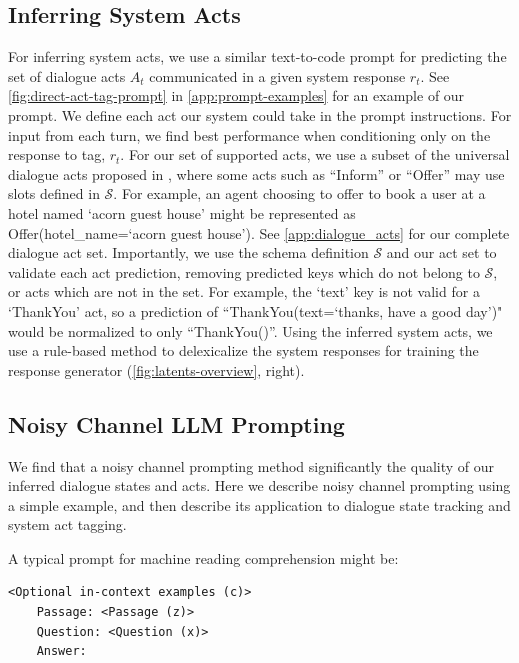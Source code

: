 \documentclass[11pt]{article}
\newcommand{\schema}[0]{\mathcal{S}}
\newcommand{\bdk}[1]{}
\newcommand{\jmf}[1]{}
\begin{document}
\subsection{Inferring System Acts} 
\label{sec:methods-tagging}
For inferring system acts, we use a similar text-to-code prompt for predicting the set of dialogue acts $A_t$ communicated in a given system response $r_t$.
See \autoref{fig:direct-act-tag-prompt} in \autoref{app:prompt-examples} for an example of our prompt.
We define each act our system could take in the prompt instructions.
For input from each turn, we find best performance when conditioning only on the response to tag, $r_t$.
For our set of supported acts, we use a subset of the universal dialogue acts proposed in \citet{paul19b_interspeech}, where some acts such as ``Inform'' or ``Offer'' may use slots defined in $\schema$.
For example, an agent choosing to offer to book a user at a hotel named `acorn guest house' might be represented as Offer(hotel\_name=`acorn guest house'). 
See \autoref{app:dialogue_acts} for our complete dialogue act set. 
Importantly, we use the schema definition $\schema$ and our act set to validate each act prediction, removing predicted keys which do not belong to $\schema$, or acts which are not in the set. For example, the `text' key is not valid for a `ThankYou' act, so a prediction of ``ThankYou(text=`thanks, have a good day')" would be normalized to only ``ThankYou()''.
Using the inferred system acts, we use a rule-based method to delexicalize the system responses for training the response generator (\autoref{fig:latents-overview}, right).
\jmf{maybe also expand on this in the response generation section} \bdk{added under \autoref{sec:methods-online-system}, Response Generation.}

\subsection{Noisy Channel LLM Prompting}
\label{sec:methods-nc-prompting}

We find that a noisy channel prompting method \cite{min-etal-2022-noisy} significantly the quality of our inferred dialogue states and acts.
Here we describe noisy channel prompting using a simple example, and then describe its application to dialogue state tracking and system act tagging.

A typical prompt for machine reading comprehension might be:
\begin{Verbatim}[fontsize=\small]
    <Optional in-context examples (c)>
    Passage: <Passage (z)>
    Question: <Question (x)>
    Answer:
\end{Verbatim}
\end{document}
